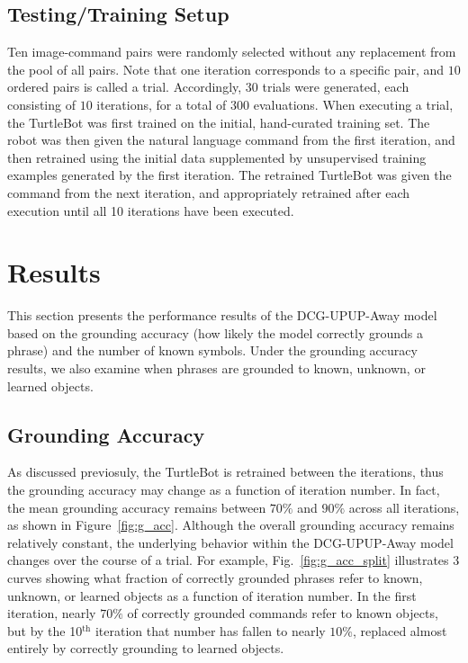 \subsection{Testing/Training Setup}
Ten image-command pairs were randomly selected without any replacement from the pool of all pairs.
Note that one iteration corresponds to a specific pair, and $10$ ordered pairs is called a trial. 
Accordingly, $30$ trials were generated, each consisting of $10$ iterations, for a total of $300$ evaluations.
When executing a trial, the TurtleBot was first trained on the initial, hand-curated training set.
The robot was then given the natural language command from the first iteration, and then retrained using the initial data supplemented by unsupervised training examples generated by the first iteration.
The retrained TurtleBot was given the command from the next iteration, and appropriately retrained after each execution until all 10 iterations have been executed.

\section{Results}
This section presents the performance results of the DCG-UPUP-Away model based on the grounding accuracy (how likely the model correctly grounds a phrase) and the number of known symbols.
Under the grounding accuracy results, we also examine when phrases are grounded to known, unknown, or learned objects.
\subsection{Grounding Accuracy}
As discussed previosuly, the TurtleBot is retrained between the iterations, thus the grounding accuracy may change as a function of iteration number. In fact, the mean grounding accuracy remains between $70\%$ and $90\%$ across all iterations, as shown in Figure~\ref{fig:g_acc}. Although the overall grounding accuracy remains relatively constant, the underlying behavior within the DCG-UPUP-Away model changes over the course of a trial. For example, Fig.~\ref{fig:g_acc_split} illustrates 3 curves showing what fraction of correctly grounded phrases refer to known, unknown, or learned objects as a function of iteration number. In the first iteration, nearly $70\%$ of correctly grounded commands refer to known objects, but by the 10$^\text{th}$ iteration that number has fallen to nearly $10\%$, replaced almost entirely by correctly grounding to learned objects.

